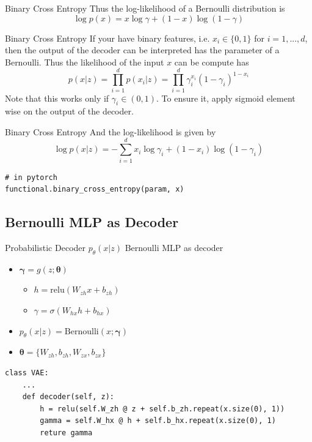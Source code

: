 \documentclass{beamer}
\newcommand{\bernoulli}{\mathrm{Bernoulli}}
\newcommand{\relu}{\mathrm{relu}}
\begin{document}
\begin{frame}{Binary Cross Entropy}
	Thus the log-likelihood of a Bernoulli distribution is
	\begin{equation}
	\log p(x) = x\log\gamma + (1-x)\log(1-\gamma)
	\end{equation}
\end{frame}

\begin{frame}[fragile]{Binary Cross Entropy}
	If your have binary features, i.e. $x_i\in \{0,1\}$ for $i=1,...,d$, then the output of the decoder can be interpreted has the parameter of a Bernoulli. Thus the likelihood of the input $x$ can be compute has 
	\begin{equation}
	p(x|z)=\prod_{i=1}^dp(x_i|z) = \prod_{i=1}^d\gamma_i^{x_i}(1-\gamma_i)^{1-x_i}
	\end{equation}
	Note that this works only if $\gamma_i\in (0, 1)$. To ensure it, apply sigmoid element wise on the output of the decoder.
\end{frame}

\begin{frame}[fragile]{Binary Cross Entropy}
And the log-likelihood is given by
	\begin{equation*}
	\log p(x|z) = -\sum_{i=1}^d x_i\log \gamma_i + (1-x_i)\log(1-\gamma_i) 
	\end{equation*}
\begin{verbatim}
# in pytorch
functional.binary_cross_entropy(param, x)
\end{verbatim}
\end{frame}

\subsection{Bernoulli MLP as Decoder}

\begin{frame}[fragile]{Probabilistic Decoder $p_\theta(x|z)$}
Bernoulli MLP as decoder
\begin{itemize}
	\item $\bm{\gamma}=g(z;\bm{\theta})$
	\begin{itemize}
		\item $h = \relu\left(W_{zh}x+b_{zh}\right)$
		\item $\gamma = \sigma\left(W_{hx}h+b_{hx}\right)$
	\end{itemize}
	\item $p_\theta(x|z)=\bernoulli(x;\bm{\gamma})$
	\item $\bm{\theta} = \{W_{zh}, b_{zh}, W_{zx}, b_{zx}\}$
\end{itemize}
\begin{verbatim}
class VAE:
    ...
    def decoder(self, z):
        h = relu(self.W_zh @ z + self.b_zh.repeat(x.size(0), 1))  
        gamma = self.W_hx @ h + self.b_hx.repeat(x.size(0), 1)      
        reture gamma
\end{verbatim}
\end{frame}
\end{document}

